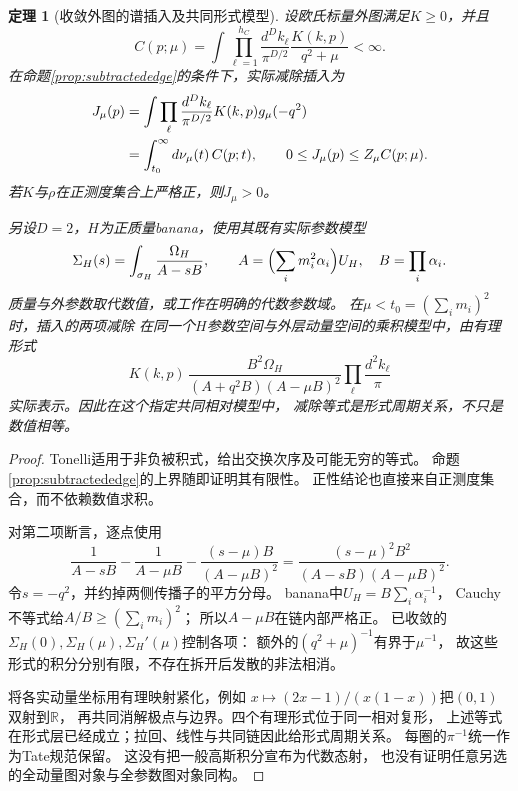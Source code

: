 \documentclass[11pt,a4paper]{ctexart}
\theoremstyle{cnplain}\newtheorem{theorem}{定理}[section]
\theoremstyle{definition}\newtheorem{definition}[theorem]{定义}
\theoremstyle{remark}\newtheorem{remark}[theorem]{注}
\begin{document}
\begin{theorem}[收敛外图的谱插入及共同形式模型]\label{thm:edgepush}
设欧氏标量外图满足$K\geq0$，并且
\[
 C(p;\mu)=\int\prod_{\ell=1}^{h_C}\frac{d^Dk_\ell}{\pi^{D/2}}
             \frac{K(k,p)}{q^2+\mu}<\infty .
\]
在命题\ref{prop:subtractededge}的条件下，实际减除插入为
\begin{align}
 J_\mu(p)&=\int\prod_\ell\frac{d^Dk_\ell}{\pi^{D/2}}
                       K(k,p)g_\mu(-q^2)\notag\\
          &=\int_{t_0}^{\infty}d\nu_\mu(t)\,C(p;t),
 \qquad 0\leq J_\mu(p)\leq Z_\mu C(p;\mu).
 \label{eq:edgepush}
\end{align}
若$K$与$\rho$在正测度集合上严格正，则$J_\mu>0$。

另设$D=2$，$H$为正质量banana，使用其既有实际参数模型
\[
 \Sigma_H(s)=\int_{\sigma_H}\frac{\Omega_H}{A-sB},
 \qquad A=\Bigl(\sum_i m_i^2\alpha_i\Bigr)U_H,\quad
 B=\prod_i\alpha_i .
\]
质量与外参数取代数值，或工作在明确的代数参数域。
在$\mu<t_0=(\sum_i m_i)^2$时，插入的两项减除
在同一个$H$参数空间与外层动量空间的乘积模型中，由有理形式
\begin{equation}\label{eq:hybridform}
 K(k,p)\,\frac{B^2\Omega_H}
              {(A+q^2B)(A-\mu B)^2}
 \prod_\ell\frac{d^2k_\ell}{\pi}
\end{equation}
实际表示。因此在这个指定共同相对模型中，
减除等式是形式周期关系，不只是数值相等。
\end{theorem}
\begin{proof}
Tonelli适用于非负被积式，给出交换次序及可能无穷的等式。
命题\ref{prop:subtractededge}的上界随即证明其有限性。
正性结论也直接来自正测度集合，而不依赖数值求积。

对第二项断言，逐点使用
\[
 \frac1{A-sB}-\frac1{A-\mu B}
 -\frac{(s-\mu)B}{(A-\mu B)^2}
 =\frac{(s-\mu)^2B^2}
       {(A-sB)(A-\mu B)^2}.
\]
令$s=-q^2$，并约掉两侧传播子的平方分母。
banana中$U_H=B\sum_i\alpha_i^{-1}$，
Cauchy不等式给$A/B\geq(\sum_i m_i)^2$；
所以$A-\mu B$在链内部严格正。
已收敛的$\Sigma_H(0),\Sigma_H(\mu),\Sigma_H'(\mu)$控制各项：
额外的$(q^2+\mu)^{-1}$有界于$\mu^{-1}$，
故这些形式的积分分别有限，不存在拆开后发散的非法相消。

将各实动量坐标用有理映射紧化，例如
$x\mapsto(2x-1)/(x(1-x))$把$(0,1)$双射到$\mathbb R$，
再共同消解极点与边界。四个有理形式位于同一相对复形，
上述等式在形式层已经成立；拉回、线性与共同链因此给形式周期关系。
每圈的$\pi^{-1}$统一作为Tate规范保留。
这没有把一般高斯积分宣布为代数态射，
也没有证明任意另选的全动量图对象与全参数图对象同构。
\end{proof}
\end{document}
